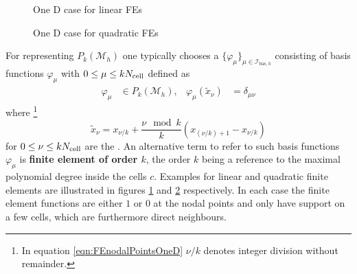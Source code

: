 \begin{figure}
	\centering
	\caption{One D case for linear FEs}
	\label{fig:FEoneDimLin}
\end{figure}
\begin{figure}
	\centering
	\caption{One D case for quadratic FEs}
	\label{fig:FEoneDimQuad}
\end{figure}
For representing $P_k(\mathcal{M}_h)$
\newcommand{\Ibash}{\mathcal{I}_{\text{bas},h}}
one typically chooses a  $\{\varphi_\mu\}_{\mu\in \Ibash}$
consisting of basis functions $\varphi_\mu$ with $0 \leq \mu \leq k N_\text{cell}$
defined as
\begin{align*}
	\varphi_\mu &\in P_k(\mathcal{M}_h), &
	\varphi_\mu(\tilde{x}_\nu) &= \delta_{\mu\nu}
\end{align*}
where%
\footnote{In equation \eqref{eqn:FEnodalPointsOneD} $\nu/k$ denotes integer division
without remainder.}
\begin{equation}
	\tilde{x}_\nu = x_{\nu/k} + \frac{\nu \!\! \mod k}{k} \left( x_{(\nu/k) +1} - x_{\nu/k} \right)
	\label{eqn:FEnodalPointsOneD}
\end{equation}
for $0 \leq \nu \leq k N_\text{cell}$ are the .
An alternative term to refer to such
basis functions $\varphi_\mu$
is \textbf{finite element of order $k$},
the order $k$ being a reference to the maximal polynomial degree inside the cells $c$.
Examples for linear and quadratic finite elements are
illustrated in figures \ref{fig:FEoneDimLin} and \ref{fig:FEoneDimQuad} respectively.
In each case the finite element functions
are either $1$ or $0$ at the nodal points and only
have support on a few cells, which are furthermore direct neighbours.

